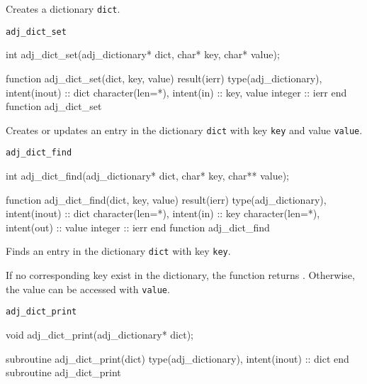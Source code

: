 Creates a dictionary \texttt{dict}.


\begin{boxwithtitle}{\texttt{adj_dict_set}}
\begin{minipage}{\columnwidth}
\begin{ccode}
  int adj_dict_set(adj_dictionary* dict, char* key, char* value);
\end{ccode}
\begin{fortrancode}
  function adj_dict_set(dict, key, value) result(ierr)
    type(adj_dictionary), intent(inout) :: dict
    character(len=*), intent(in) :: key, value
    integer :: ierr
  end function adj_dict_set
\end{fortrancode}
\end{minipage}
\end{boxwithtitle}

Creates or updates an entry in the dictionary \texttt{dict} with key \texttt{key} and value \texttt{value}.


\begin{boxwithtitle}{\texttt{adj_dict_find}}
\begin{minipage}{\columnwidth}
\begin{ccode}
  int adj_dict_find(adj_dictionary* dict, char* key, char** value);
\end{ccode}
\begin{fortrancode}
  function adj_dict_find(dict, key, value) result(ierr)
    type(adj_dictionary), intent(inout) :: dict
    character(len=*), intent(in) :: key
    character(len=*), intent(out) :: value
    integer :: ierr
  end function adj_dict_find
\end{fortrancode}
\end{minipage}
\end{boxwithtitle}

Finds an entry in the dictionary \texttt{dict} with key \texttt{key}.

If no corresponding key exist in the dictionary, the function returns .
Otherwise, the value can be accessed with \texttt{value}.



\begin{boxwithtitle}{\texttt{adj_dict_print}}
\begin{minipage}{\columnwidth}
\begin{ccode}
  void adj_dict_print(adj_dictionary* dict);
\end{ccode}
\begin{fortrancode}
  subroutine adj_dict_print(dict)
    type(adj_dictionary), intent(inout) :: dict
  end subroutine adj_dict_print
\end{fortrancode}
\end{minipage}
\end{boxwithtitle}


